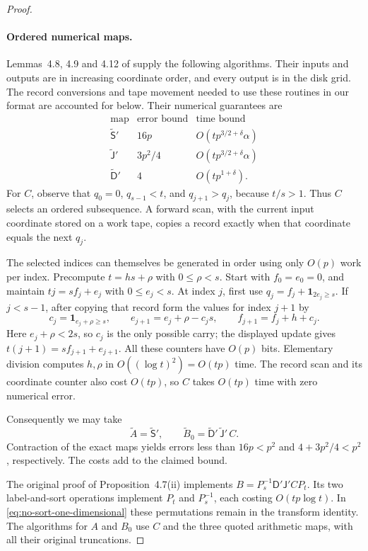 \begin{proof}
\paragraph{Ordered numerical maps.}
Lemmas~4.8, 4.9 and 4.12 of
\cite{HarveyHoeven2021} supply the following algorithms. Their inputs
and outputs are in increasing coordinate order, and every output is in
the disk grid. The record conversions and tape movement needed to use
these routines in our format are accounted for below. Their numerical
guarantees are
\[
\begin{array}{c|c|c}
 \text{map}&\text{error bound}&\text{time bound}\\ \hline
 \widetilde{\mathsf S}'&16p&O(tp^{3/2+\delta}\alpha)\\
 \widetilde{\mathsf J}'&3p^2/4&O(tp^{3/2+\delta}\alpha)\\
 \widetilde{\mathsf D}'&4&O(tp^{1+\delta}).
\end{array}
\]
For $C$, observe that $q_0=0$, $q_{s-1}<t$, and $q_{j+1}>q_j$,
because $t/s>1$. Thus $C$ selects an ordered subsequence. A forward scan,
with the current input coordinate stored on a work tape, copies a record
exactly when that coordinate equals the next $q_j$.

The selected indices can themselves be generated in order using only
$O(p)$ work per index. Precompute $t=hs+\rho$ with $0\leq\rho<s$.
Start with $f_0=e_0=0$, and maintain
$tj=sf_j+e_j$ with $0\leq e_j<s$. At index $j$, first use
$q_j=f_j+\mathbf1_{2e_j\geq s}$. If $j<s-1$, after copying that record
form the values for index $j+1$ by
\[
 c_j=\mathbf1_{e_j+\rho\geq s},\qquad
 e_{j+1}=e_j+\rho-c_js,\qquad
 f_{j+1}=f_j+h+c_j.
\]
Here $e_j+\rho<2s$, so $c_j$ is the only possible carry; the displayed
update gives $t(j+1)=sf_{j+1}+e_{j+1}$. All these counters have $O(p)$
bits. Elementary division computes $h,\rho$ in
$O((\log t)^2)=O(tp)$ time. The record scan and its coordinate counter
also cost $O(tp)$, so $C$ takes $O(tp)$ time with zero numerical error.

Consequently we may take
\[
 \widetilde A=\widetilde{\mathsf S}',
 \qquad
 \widetilde B_0=\widetilde{\mathsf D}'\,
                    \widetilde{\mathsf J}'\,C.
\]
Contraction of the exact maps yields errors less than $16p<p^2$ and
$4+3p^2/4<p^2$, respectively. The costs add to the claimed bound.

The original proof of Proposition~4.7(ii) implements
$B=P_s^{-1}\mathsf D'\mathsf J'CP_t$. Its two label-and-sort operations
implement $P_t$ and $P_s^{-1}$, each costing $O(tp\log t)$.
In \eqref{eq:no-sort-one-dimensional} these permutations remain in the
transform identity. The algorithms for $A$ and $B_0$ use $C$ and the
three quoted arithmetic maps, with all their original truncations.


\end{proof}
